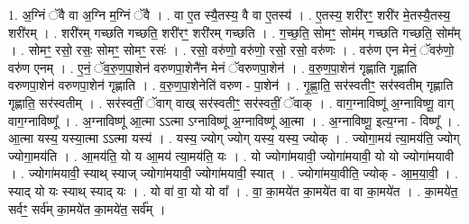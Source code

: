 \documentclass[17pt]{extarticle}
\begin{document}
1. अ॒ग्निं ॅवै वा अ॒ग्नि म॒ग्निं ॅवै । . वा ए॒त स्यै॒तस्य॒ वै वा ए॒तस्य॑ । . ए॒तस्य॒ शरी॑रꣳ॒॒ शरी॑र मे॒तस्यै॒तस्य॒ शरी॑रम् । . शरी॑रम् गच्छति गच्छति॒ शरी॑रꣳ॒॒ शरी॑रम् गच्छति । . ग॒च्छ॒ति॒ सोमꣳ॒॒ सोम॑म् गच्छति गच्छति॒ सोम᳚म् । . सोमꣳ॒॒ रसो॒ रसः॒ सोमꣳ॒॒ सोमꣳ॒॒ रसः॑ । . रसो॒ वरु॑णो॒ वरु॑णो॒ रसो॒ रसो॒ वरु॑णः । . वरु॑ण एन मेनं॒ ॅवरु॑णो॒ वरु॑ण एनम् । . ए॒नं॒ ॅव॒रु॒ण॒पा॒शेन॑ वरुणपा॒शेनै॑न मेनं ॅवरुणपा॒शेन॑ । . व॒रु॒ण॒पा॒शेन॑ गृह्णाति गृह्णाति वरुणपा॒शेन॑ वरुणपा॒शेन॑ गृह्णाति । . व॒रु॒ण॒पा॒शेनेति॑ वरुण - पा॒शेन॑ । . गृ॒ह्णा॒ति॒ सर॑स्वतीꣳ॒॒ सर॑स्वतीम् गृह्णाति गृह्णाति॒ सर॑स्वतीम् । . सर॑स्वतीं॒ ॅवाग् वाख् सर॑स्वतीꣳ॒॒ सर॑स्वतीं॒ ॅवाक् । . वाग॒ग्नाविष्णू॑ अ॒ग्नाविष्णू॒ वाग् वाग॒ग्नाविष्णू᳚ । . अ॒ग्नाविष्णू॑ आ॒त्मा ऽऽत्मा ऽग्नाविष्णू॑ अ॒ग्नाविष्णू॑ आ॒त्मा । . अ॒ग्नाविष्णू॒ इत्य॒ग्ना - विष्णू᳚ । . आ॒त्मा यस्य॒ यस्या॒त्मा ऽऽत्मा यस्य॑ । . यस्य॒ ज्योग् ज्योग् यस्य॒ यस्य॒ ज्योक् । . ज्योगा॒मय॑ त्या॒मय॑ति॒ ज्योग् ज्योगा॒मय॑ति । . आ॒मय॑ति॒ यो य आ॒मय॑ त्या॒मय॑ति॒ यः । . यो ज्योगा॑मयावी॒ ज्योगा॑मयावी॒ यो यो ज्योगा॑मयावी । . ज्योगा॑मयावी॒ स्याथ् स्याज् ज्योगा॑मयावी॒ ज्योगा॑मयावी॒ स्यात् । . ज्योगा॑मया॒वीति॒ ज्योक् - आ॒म॒या॒वी॒ । . स्याद् यो यः स्याथ् स्याद् यः । . यो वा॑ वा॒ यो यो वा᳚ । . वा॒ का॒मये॑त का॒मये॑त वा वा का॒मये॑त । . का॒मये॑त॒ सर्वꣳ॒॒ सर्व॑म् का॒मये॑त का॒मये॑त॒ सर्व᳚म् । \newline
\end{document}
